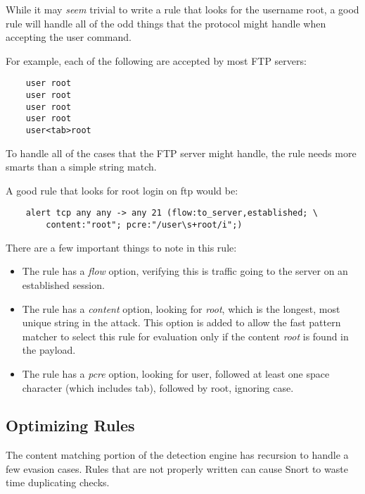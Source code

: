 \documentclass[english]{report}
\begin{document}
While it may \emph{seem} trivial to write a rule that looks for the username
root, a good rule will handle all of the odd things that the protocol might
handle when accepting the user command.

For example, each of the following are accepted by most FTP servers:

\begin{verbatim}
    user root
    user root
    user root
    user root
    user<tab>root
\end{verbatim}

To handle all of the cases that the FTP server might handle, the rule needs
more smarts than a simple string match.

A good rule that looks for root login on ftp would be:

\begin{verbatim}
    alert tcp any any -> any 21 (flow:to_server,established; \
        content:"root"; pcre:"/user\s+root/i";)
\end{verbatim}

There are a few important things to note in this rule:

\begin{itemize}

\item The rule has a \emph{flow} option, verifying this is traffic going to the
server on an established session.

\item The rule has a \emph{content} option, looking for \emph{root}, which is
the longest, most unique string in the attack.  This option is added to allow
the fast pattern matcher to select this rule for evaluation only if the
content \emph{root} is found in the payload.

\item The rule has a \emph{pcre} option, looking for user, followed at least
one space character (which includes tab), followed by root, ignoring case.

\end{itemize}

\subsection{Optimizing Rules}

The content matching portion of the detection engine has recursion to handle a
few evasion cases.  Rules that are not properly written can cause Snort to
waste time duplicating checks.
\end{document}
